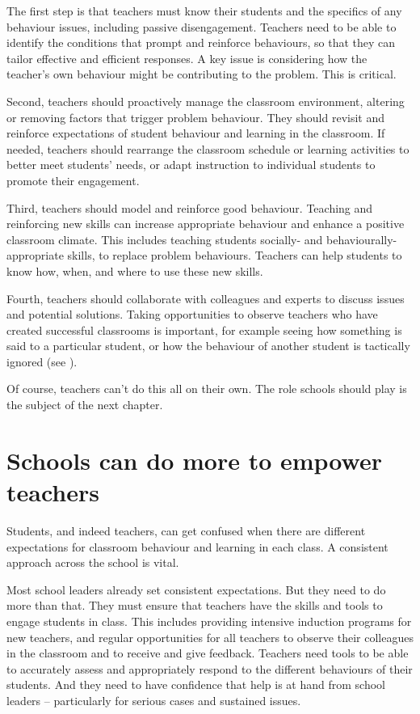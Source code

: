\documentclass{grattan}
\begin{document}
The first step is that teachers must know their students and the specifics of any behaviour issues, including passive disengagement. Teachers need to be able to identify the conditions that prompt and reinforce behaviours, so that they can tailor effective and efficient responses. A key issue is considering how the teacher's own behaviour might be contributing to the problem. This is critical.

Second, teachers should proactively manage the classroom environment, altering or removing factors that trigger problem behaviour. They should revisit and reinforce expectations of student behaviour and learning in the classroom. If needed, teachers should rearrange the classroom schedule or learning activities to better meet students' needs, or adapt instruction to individual students to promote their engagement.

Third, teachers should model and reinforce good behaviour. Teaching and reinforcing new skills can increase appropriate behaviour and enhance a positive classroom climate. This includes teaching students socially- and behaviourally-appropriate skills, to replace problem behaviours. Teachers can help students to know how, when, and where to use these new skills.

Fourth, teachers should collaborate with colleagues and experts to discuss issues and potential solutions. Taking opportunities to observe teachers who have created successful classrooms is important, for example seeing how something is said to a particular student, or how the behaviour of another student is tactically ignored (see ).

Of course, teachers can't do this all on their own. The role schools should play is the subject of the next chapter.






\chapter{Schools can do more to empower teachers}\label{chap:schools-can-do-more}
Students, and indeed teachers, can get confused when there are different expectations for classroom behaviour and learning in each class. A consistent approach across the school is vital.

Most school leaders already set consistent expectations. But they need to do more than that. They must ensure that teachers have the skills and tools to engage students in class. This includes providing intensive induction programs for new teachers, and regular opportunities for all teachers to observe their colleagues in the classroom and to receive and give feedback. Teachers need tools to be able to accurately assess and appropriately respond to the different behaviours of their students. And they need to have confidence that help is at hand from school leaders -- particularly for serious cases and sustained issues.
\end{document}
